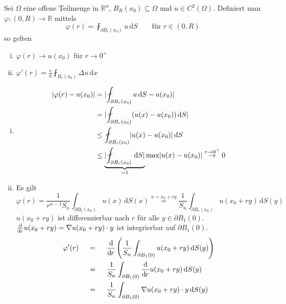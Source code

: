 \begin{lemma}
	Sei $\Omega$ eine offene Teilmenge in $\mathbb{R}^n$, $B_R(x_0) \subseteq \Omega$ und $u \in C^2(\Omega)$. Definiert man $\varphi : (0,R) \to \mathbb{R}$ mittels
	\[
		\varphi(r) = \fint_{\partial B_r(x_0)}^{} u \,\mathrm{d}S \qquad \text{für } r \in (0,R)
	\]
	so gelten
	\begin{enumerate}[(i)]
		\item $\varphi(r) \to  u (x_0)$ für $ r \to 0^+$
		\item $\varphi'(r) = \frac{r}{n} \fint_{B_r(x_0)}^{} \Delta u \,\mathrm{d}x$ 
	\end{enumerate}
	\end{lemma}
	\begin{beweis}
		\begin{enumerate}[(i)]
			\item \begin{align*}
				\abs{ \varphi(r)-u(x_0)} &= \abs{ \fint_{\partial B_r(x_0)}^{}u \,\mathrm{d}S - u(x_0)} \\
				&= \abs{ \fint_{\partial B_r(x_0)}^{} (u(x)-u(x_0)) \,\mathrm{d}S} \\
				& \leq \fint_{\partial B_r(x_0)}^{} \abs{u(x)-u(x_0)} \,\mathrm{d}S \\
				& \leq  \underset{=1}{\underbrace{\abs{\fint_{\partial B_r(x_0)}^{} \,\mathrm{d}S}}} \max \abs{u(x)-u(x_0)} \stackrel{r \to 0^+}{\to} 0
			\end{align*}
		\item Es gilt
		\begin{equation}
			\varphi(r) = \frac{1}{r^{n-1}S_n} \int_{\partial B_r(x_0)}^{}u(x) \,\mathrm{d}S(x) \stackrel{x=x_0 + r y}{=} \frac{1}{S_n} \int_{\partial B_r(x_0)}^{} u(x_0 + ry) \,\mathrm{d}S(y)
		\end{equation}
		$u(x_0 + ry)$ ist differenzierbar nach $r$ für alle $y \in \partial B_1(0)$. \\
		$\frac{\mathrm{d}\mkern-1.0mu }{\mathrm{d}\mkern-1.0mu r} u(x_0 + ry) =  \nabla u(x_0+ry) \cdot y$ ist integrierbar auf $ \partial B_1(0)$.
		\begin{align*}
			\varphi'(r) &\stackrel{\hphantom{x=x_0+ry}}{=} \diffd{}{r} \left( \frac{1}{S_n} \int_{\partial B_1(0)}^{} u(x_0 + ry) \,\mathrm{d}S(y) \right) \\
			& \stackrel{\hphantom{x=x_0+ry}}{=} \frac{1}{S_n} \int_{\partial B_1(0)}^{} \diffd{}{r} u(x_0 + ry) \,\mathrm{d}S(y) \\
			& \stackrel{\hphantom{x=x_0+ry}}{=} \frac{1}{S_n} \int_{\partial B_1(0)}^{} \nabla u(x_0 + r y) \cdot y \,\mathrm{d}S(y) \\

\end{align*}
\end{enumerate}
\end{beweis}
